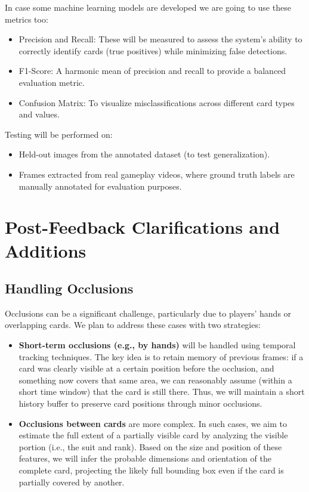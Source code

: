 \documentclass{article}
\begin{document}
In case some machine learning models are developed we are going to use these metrics too: 

\begin{itemize}
	\item Precision and Recall: These will be measured to assess the system’s ability to correctly identify cards (true positives) while minimizing false detections.
	\item F1-Score: A harmonic mean of precision and recall to provide a balanced evaluation metric.
	\item Confusion Matrix: To visualize misclassifications across different card types and values.
\end{itemize}

Testing will be performed on:

\begin{itemize}
	\item Held-out images from the annotated dataset (to test generalization).
	\item Frames extracted from real gameplay videos, where ground truth labels are manually annotated for evaluation purposes.
\end{itemize}
\newpage
\section*{Post-Feedback Clarifications and Additions}

\subsection*{Handling Occlusions}

Occlusions can be a significant challenge, particularly due to players’ hands or overlapping cards. We plan to address these cases with two strategies:

\begin{itemize}
    \item \textbf{Short-term occlusions (e.g., by hands)} will be handled using temporal tracking techniques. The key idea is to retain memory of previous frames: if a card was clearly visible at a certain position before the occlusion, and something now covers that same area, we can reasonably assume (within a short time window) that the card is still there. Thus, we will maintain a short history buffer to preserve card positions through minor occlusions.
    
    \item \textbf{Occlusions between cards} are more complex. In such cases, we aim to estimate the full extent of a partially visible card by analyzing the visible portion (i.e., the suit and rank). Based on the size and position of these features, we will infer the probable dimensions and orientation of the complete card, projecting the likely full bounding box even if the card is partially covered by another.
\end{itemize}
\end{document}
